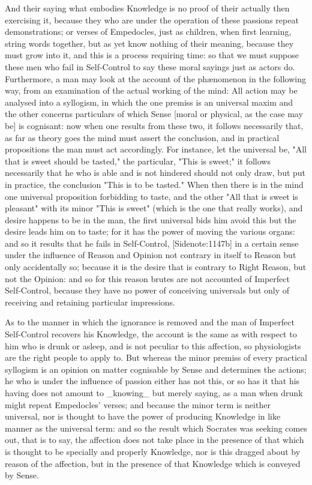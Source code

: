 And their saying what embodies Knowledge is no proof of their actually
then exercising it, because they who are under the operation of these
passions repeat demonstrations; or verses of Empedocles, just as
children, when first learning, string words together, but as yet know
nothing of their meaning, because they must grow into it, and this is a
process requiring time: so that we must suppose these men who fail in
Self-Control to say these moral sayings just as actors do. Furthermore,
a man may look at the account of the phænomenon in the following way,
from an examination of the actual working of the mind: All action may
be analysed into a syllogism, in which the one premiss is an universal
maxim and the other concerns particulars of which Sense [moral or
physical, as the case may be] is cognisant: now when one results from
these two, it follows necessarily that, as far as theory goes the mind
must assert the conclusion, and in practical propositions the man must
act accordingly. For instance, let the universal be, "All that is
sweet should be tasted," the particular, "This is sweet;" it follows
necessarily that he who is able and is not hindered should not only
draw, but put in practice, the conclusion "This is to be tasted." When
then there is in the mind one universal proposition forbidding to taste,
and the other "All that is sweet is pleasant" with its minor "This is
sweet" (which is the one that really works), and desire happens to be in
the man, the first universal bids him avoid this but the desire leads
him on to taste; for it has the power of moving the various organs:
and so it results that he fails in Self-Control, [Sidenote:1147b] in a
certain sense under the influence of Reason and Opinion not contrary in
itself to Reason but only accidentally so; because it is the desire that
is contrary to Right Reason, but not the Opinion: and so for this reason
brutes are not accounted of Imperfect Self-Control, because they have
no power of conceiving universals but only of receiving and retaining
particular impressions.

As to the manner in which the ignorance is removed and the man of
Imperfect Self-Control recovers his Knowledge, the account is the same
as with respect to him who is drunk or asleep, and is not peculiar to
this affection, so physiologists are the right people to apply to. But
whereas the minor premiss of every practical syllogism is an opinion on
matter cognisable by Sense and determines the actions; he who is under
the influence of passion either has not this, or so has it that his
having does not amount to _knowing_ but merely saying, as a man when
drunk might repeat Empedocles' verses; and because the minor term
is neither universal, nor is thought to have the power of producing
Knowledge in like manner as the universal term: and so the result which
Socrates was seeking comes out, that is to say, the affection does not
take place in the presence of that which is thought to be specially
and properly Knowledge, nor is this dragged about by reason of the
affection, but in the presence of that Knowledge which is conveyed by
Sense.

